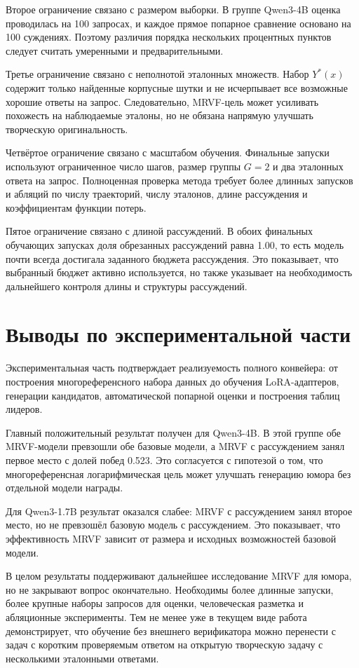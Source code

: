 Второе ограничение связано с размером выборки. В группе Qwen3-4B оценка проводилась на 100 запросах, и каждое прямое попарное сравнение основано на 100 суждениях. Поэтому различия порядка нескольких процентных пунктов следует считать умеренными и предварительными.

Третье ограничение связано с неполнотой эталонных множеств. Набор \(Y^{*}(x)\) содержит только найденные корпусные шутки и не исчерпывает все возможные хорошие ответы на запрос. Следовательно, MRVF-цель может усиливать похожесть на наблюдаемые эталоны, но не обязана напрямую улучшать творческую оригинальность.

Четвёртое ограничение связано с масштабом обучения. Финальные запуски используют ограниченное число шагов, размер группы \(G=2\) и два эталонных ответа на запрос. Полноценная проверка метода требует более длинных запусков и абляций по числу траекторий, числу эталонов, длине рассуждения и коэффициентам функции потерь.

Пятое ограничение связано с длиной рассуждений. В обоих финальных обучающих запусках доля обрезанных рассуждений равна 1.00, то есть модель почти всегда достигала заданного бюджета рассуждения. Это показывает, что выбранный бюджет активно используется, но также указывает на необходимость дальнейшего контроля длины и структуры рассуждений.

\section{Выводы по экспериментальной части}

Экспериментальная часть подтверждает реализуемость полного конвейера: от построения многореференсного набора данных до обучения LoRA-адаптеров, генерации кандидатов, автоматической попарной оценки и построения таблиц лидеров.

Главный положительный результат получен для Qwen3-4B. В этой группе обе MRVF-модели превзошли обе базовые модели, а MRVF с рассуждением занял первое место с долей побед 0.523. Это согласуется с гипотезой о том, что многореференсная логарифмическая цель может улучшать генерацию юмора без отдельной модели награды.

Для Qwen3-1.7B результат оказался слабее: MRVF с рассуждением занял второе место, но не превзошёл базовую модель с рассуждением. Это показывает, что эффективность MRVF зависит от размера и исходных возможностей базовой модели.

В целом результаты поддерживают дальнейшее исследование MRVF для юмора, но не закрывают вопрос окончательно. Необходимы более длинные запуски, более крупные наборы запросов для оценки, человеческая разметка и абляционные эксперименты. Тем не менее уже в текущем виде работа демонстрирует, что обучение без внешнего верификатора можно перенести с задач с коротким проверяемым ответом на открытую творческую задачу с несколькими эталонными ответами.

